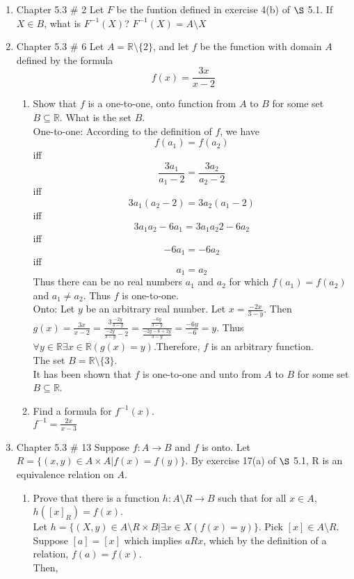 \documentclass[10pt,a4paper]{article}
\begin{document}
\begin{enumerate}
\begin{enumerate}
\end{enumerate}
\item Chapter 5.3 \# 2 Let $F$ be the funtion defined in exercise 4(b) of $\S$ 5.1. If $X \in B$, what is $F^{-1}(X)$?
$F^{-1}(X)= A \setminus X$
\item Chapter 5.3 \# 6 Let $A = \mathbb{R}\setminus \{2\}$, and let $f$ be the function with domain $A$ defined by the formula $$f(x)=\frac{3x}{x-2}$$
\begin{enumerate}
\item Show that $f$ is  a one-to-one, onto function from $A$ to $B$ for some set $B \subseteq \mathbb{R}$. What is the set $B$. \\ 
One-to-one: According to the definition of $f$, we have\\  $$f(a_1)=f(a_2) $$ iff $$\frac{3a_1}{a_1 -2}=\frac{3a_2}{a_2 -2} $$
iff $$3a_1(a_2 -2)=3a_2(a_1 -2) $$
iff $$3a_1 a_2 - 6a_1 = 3a_1 a_2 2- 6 a_2 $$
iff $$-6a_1=-6a_2$$
iff $$a_1=a_2 $$
Thus there can be no real numbers $a_1$ and $a_2$ for which $f(a_1)=f(a_2)$ and $a_1 \not = a_2$. Thus $f$ is one-to-one.\\
Onto: Let $y$ be an arbitrary real number. Let $x= \frac{-2x}{3-y}$. Then $g(x)= \frac{3x}{x-2}=\frac{3\frac{-2y}{3-y}}{\frac{-2y}{3-y}-2}=\frac{\frac{-6y}{3-y}}{\frac{-2y-6+2y}{3-y}} = \frac{-6y}{-6}=y$. Thus $\forall y \in \mathbb{R} \exists x \in \mathbb{R} (g(x)=y)$.Therefore, $f$ is an arbitrary function. \\
The set $B= \mathbb{R} \setminus \{3\}$.\\
It has been shown that $f$ is one-to-one and unto from $A$ to $B$ for some set $B \subseteq \mathbb{R}$.
\item Find a formula for $f^{-1} (x)$.\\
$f^{-1} = \frac{2x}{x-3}$
\end{enumerate}
\item Chapter 5.3 \# 13 Suppose $f : A \to B$ and $f$ is onto. Let $R=\{(x,y)\in A \times A | f(x)=f(y) \}$. By exercise 17(a) of $\S$ 5.1, R is an equivalence relation on $A$.
\begin{enumerate}
\item  Prove that there is a function $h: A \setminus R \to B$ such that for all $x \in A$, $h([x]_R) = f(x)$.\\
Let $h=\{(X,y) \in A\setminus R \times B | \exists x \in X (f(x) =y) \}$. Pick $[x] \in A\setminus R$. Suppose $[a]=[x]$ which implies $aRx$, which by the definition of a relation, $f(a)=f(x)$.\\ Then, 

\end{enumerate}
\end{enumerate}
\end{document}
